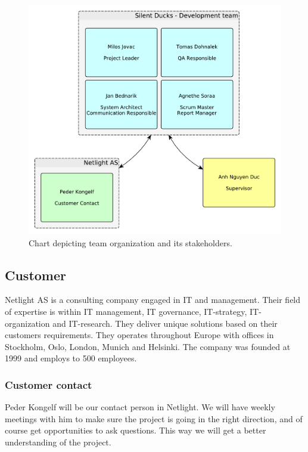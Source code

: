 \begin{figure}[!h]
    \begin{center}
    \includegraphics[scale=0.4]{images/organization_chart.pdf}
    \caption{Chart depicting team organization and its stakeholders.}
    \label{img:organization_chart}
    \end{center}
\end{figure}

\subsection{Customer}
Netlight AS is a consulting company engaged in IT and management. Their field of expertise is within IT management, IT governance, IT-strategy, IT-organization and IT-research. They deliver unique solutions based on their customers requirements. They operates throughout Europe with offices in Stockholm, Oslo, London, Munich and Helsinki. The company was founded at 1999 and employs to 500 employees. 
\subsubsection{Customer contact}
Peder Kongelf will be our contact person in Netlight. We will have weekly meetings with him to make sure the project is going in the right direction, and of course get opportunities to ask questions. This way we will get a better understanding of the project.


